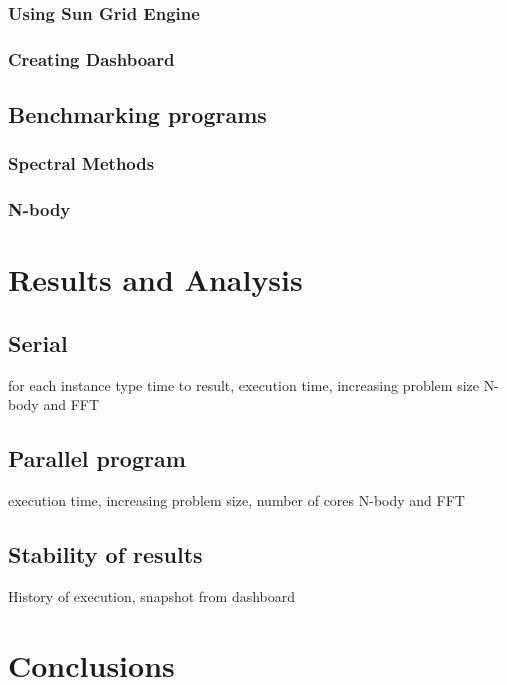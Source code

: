 \documentclass[12pt,a4paper]{report}
\begin{document}
\subsection{Using Sun Grid Engine}
\subsection{Creating Dashboard}

\section{Benchmarking  programs}
\subsection{Spectral Methods}
\subsection{N-body}

\chapter{Results and Analysis}
\section{Serial}
for each instance type
time to result, execution time, increasing problem size
N-body and FFT

\section{Parallel program}
execution time, increasing problem size, number of cores
N-body and FFT
\section{Stability of results}
History of execution, snapshot from dashboard

\chapter{Conclusions}


\appendix





\end{document}
